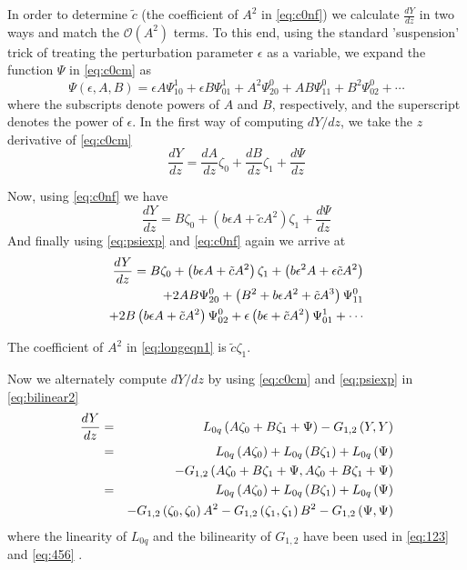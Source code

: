 In order to determine $\tilde{c}$ (the coefficient of $A^2$ in \eqref{eq:c0nf})
we calculate $\frac{dY}{dz}$ in two ways and match the $\mathcal{O}(A^2)$
terms.  To this end, using the standard 'suspension' trick of treating the
perturbation parameter $\epsilon$ as a variable, we expand the function $\Psi$
in \eqref{eq:c0cm} as 
\begin{equation}\label{eq:psiexp}
\Psi(\epsilon,A,B) = \epsilon A \Psi_{10}^1 + \epsilon B \Psi_{01}^1 + A^2 \Psi_{20}^0 + A B \Psi_{11}^0 + B^2 \Psi_{02}^0 + \cdots
\end{equation}
where the subscripts denote powers of $A$ and $B$, respectively, and the
superscript denotes the power of $\epsilon$.  In the first way of computing
$dY/dz$, we take the $z$ derivative of \eqref{eq:c0cm}
\begin{equation}
\frac{dY}{dz} = \frac{dA}{dz} \zeta_0 + \frac{dB}{dz} \zeta_1 + \frac{d\Psi}{dz}
\end{equation}

Now, using \eqref{eq:c0nf} we have
\begin{equation}
\frac{dY}{dz} = B \zeta_0 + \left(b \epsilon A + \tilde{c} A^2\right)\zeta_1 + \frac{d\Psi}{dz}
\end{equation}
And finally using \eqref{eq:psiexp} and \eqref{eq:c0nf} again we arrive at
\begin{align}
\frac{dY}{dz} = B \zeta_0 + \left(b \epsilon A + \tilde{c} A^2\right)\zeta_1 + \left( b \epsilon^2 A + \epsilon \tilde{c} A^2\right) \label{eq:longeqn1}\\
                + 2 A B\Psi_{20}^0 + \left( B^2 + b\epsilon A^2 + \tilde{c} A^3\right)\Psi_{11}^0 \notag \\ 
                + 2 B \left( b \epsilon A + \tilde{c} A^2 \right)\Psi_{02}^0 + \epsilon \left(b \epsilon + \tilde{c}A^2\right) 
                \Psi_{01}^1 + \cdots \notag
\end{align}

The coefficient of $A^2$ in \eqref{eq:longeqn1} 
is $\tilde{c} \zeta_1 $. 

Now we alternately compute $dY/dz$ by using 
\eqref{eq:c0cm} and \eqref{eq:psiexp} in \eqref{eq:bilinear2}
\begin{align}\label{eq:dydz}
\frac{dY}{dz} &=& L_{0q}\left( A \zeta_0 + B \zeta_1 + \Psi \right) - G_{1,2}\left(Y,Y\right) \\
&=& L_{0q} \left(A\zeta_0\right) + L_{0q}\left(B\zeta_1\right) + L_{0q}\left(\Psi\right) \label{eq:123} \\
& & - G_{1,2}\left( A \zeta_0 + B \zeta_1 + \Psi ,A \zeta_0 + B \zeta_1 + \Psi \right) \notag \\
&=& L_{0q} \left(A\zeta_0\right) + L_{0q}\left(B\zeta_1\right) + L_{0q}\left(\Psi\right) \label{eq:456}  \\
& & - G_{1,2}\left(  \zeta_0, \zeta_0\right)A^2 - G_{1,2}\left( \zeta_1, \zeta_1\right)B^2 -G_{1,2}\left( \Psi, \Psi\right) \notag
\end{align}
where the linearity of $L_{0q}$ and the bilinearity of $G_{1,2}$ have been used in \eqref{eq:123} and \eqref{eq:456} .

